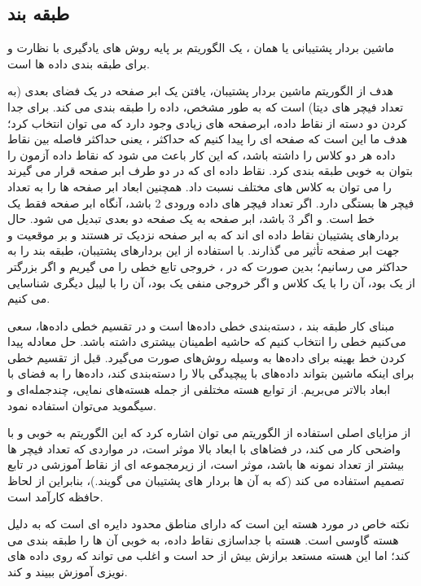 \documentclass[12pt,onecolumn,a4paper]{article}
\begin{document}
\subsection{طبقه بند }
ماشین بردار پشتیبانی یا همان ، یک الگوریتم بر پایه روش های یادگیری با نظارت و برای طبقه بندی داده ها است.

هدف از الگوریتم ماشین بردار پشتیبان، یافتن یک ابر صفحه در یک فضای  بعدی (به تعداد فیچر های دیتا) است که به طور مشخص، داده را طبقه بندی می کند. برای جدا کردن دو دسته از نقاط داده، ابرصفحه های زیادی وجود دارد که می توان انتخاب کرد؛ هدف ما این است که صفحه ای را پیدا کنیم که حداکثر ، یعنی حداکثر فاصله بین نقاط داده هر دو کلاس را داشته باشد، که این کار باعث می شود که نقاط داده آزمون را بتوان به خوبی طبقه بندی کرد. نقاط داده ای که در دو طرف ابر صفحه قرار می گیرند را می توان به کلاس های مختلف نسبت داد. همچنین ابعاد ابر صفحه ها را به تعداد فیچر ها بستگی دارد. اگر تعداد فیچر های داده ورودی 2 باشد، آنگاه ابر صفحه فقط یک خط است. و اگر 3 باشد، ابر صفحه به یک صفحه دو بعدی تبدیل می شود. حال بردارهای پشتیبان نقاط داده ای اند که به ابر صفحه نزدیک تر هستند و بر موقعیت و جهت ابر صفحه تأثیر می گذارند. با استفاده از این بردارهای پشتیبان،  طبقه بند را به حداکثر می رسانیم؛ بدین صورت که در ، خروجی تابع خطی را می گیریم و اگر بزرگتر از یک بود، آن را با یک کلاس و اگر خروجی منفی یک بود، آن را با لیبل دیگری شناسایی می کنیم. 

مبنای کار طبقه بند ، دسته‌بندی خطی داده‌ها است و در تقسیم خطی داده‌ها، سعی می‌کنیم خطی را انتخاب کنیم که حاشیه اطمینان بیشتری داشته باشد. حل معادله پیدا کردن خط بهینه برای داده‌ها به وسیله روش‌های  صورت می‌گیرد. قبل از تقسیم خطی برای اینکه ماشین بتواند داده‌های با پیچیدگی بالا را دسته‌بندی کند، داده‌ها را به فضای با ابعاد بالاتر می‌بریم. از توابع هسته مختلفی از جمله هسته‌های نمایی، چندجمله‌ای و سیگموید می‌توان استفاده نمود.

از مزایای اصلی استفاده از الگوریتم  می توان اشاره کرد که این الگوریتم به خوبی و با  واضحی کار می کند، در فضاهای با ابعاد بالا موثر است، در مواردی که تعداد فیچر ها بیشتر از تعداد نمونه ها باشد، موثر است، از زیرمجموعه ای از نقاط آموزشی در تابع تصمیم استفاده می کند (که به آن ها بردار های پشتیبان می گویند.)، بنابراین از لحاظ حافظه کارآمد است.

نکته خاص در مورد هسته  این است که دارای مناطق محدود دایره ای است که به دلیل هسته گاوسی است. هسته  با جداسازی نقاط داده، به خوبی آن ها را طبقه بندی می کند؛ اما این هسته مستعد برازش بیش از حد است و اغلب می تواند که روی داده های نویزی آموزش ببیند و  کند.
\end{document}
